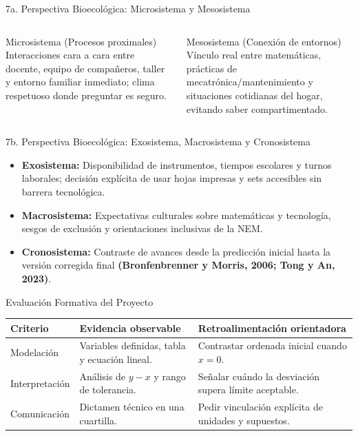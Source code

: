 \documentclass[aspectratio=169,spanish,xcolor=table]{beamer}
\begin{document}
\begin{frame}{7a. Perspectiva Bioecológica: Microsistema y Mesosistema}
  \begin{columns}[T]
      \begin{block}{Microsistema (Procesos proximales)}
        \scriptsize Interacciones cara a cara entre docente, equipo de compañeros, taller y entorno familiar inmediato; clima respetuoso donde preguntar es seguro.
      \end{block}
      \begin{block}{Mesosistema (Conexión de entornos)}
        \scriptsize Vínculo real entre matemáticas, prácticas de mecatrónica/mantenimiento y situaciones cotidianas del hogar, evitando saber compartimentado.
      \end{block}
  \end{columns}
\end{frame}

\begin{frame}{7b. Perspectiva Bioecológica: Exosistema, Macrosistema y Cronosistema}
  \begin{itemize}\small
    \item \textbf{\color{iiiepeNavy}Exosistema:} Disponibilidad de instrumentos, tiempos escolares y turnos laborales; decisión explícita de usar hojas impresas y sets accesibles sin barrera tecnológica.
    \item \textbf{\color{iiiepeBlue}Macrosistema:} Expectativas culturales sobre matemáticas y tecnología, sesgos de exclusión y orientaciones inclusivas de la NEM.
    \item \textbf{\color{iiiepeAqua!75!black}Cronosistema:} Contraste de avances desde la predicción inicial hasta la versión corregida final \textbf{(Bronfenbrenner y Morris, 2006; Tong y An, 2023)}.
  \end{itemize}
\end{frame}

\begin{frame}{Evaluación Formativa del Proyecto}
  \scriptsize\renewcommand{\arraystretch}{1.38}
  \begin{tabular}{p{2.4cm}p{5.2cm}p{5.2cm}}
    \toprule
    \rowcolor{iiiepePale} \textbf{Criterio} & \textbf{Evidencia observable} & \textbf{Retroalimentación orientadora} \\
    \midrule
    Modelación & Variables definidas, tabla y ecuación lineal. & Contrastar ordenada inicial cuando $x=0$. \\
    Interpretación & Análisis de $y-x$ y rango de tolerancia. & Señalar cuándo la desviación supera límite aceptable. \\
    Comunicación & Dictamen técnico en una cuartilla. & Pedir vinculación explícita de unidades y supuestos. \\
    \bottomrule
  \end{tabular}
\end{frame}
\end{document}
